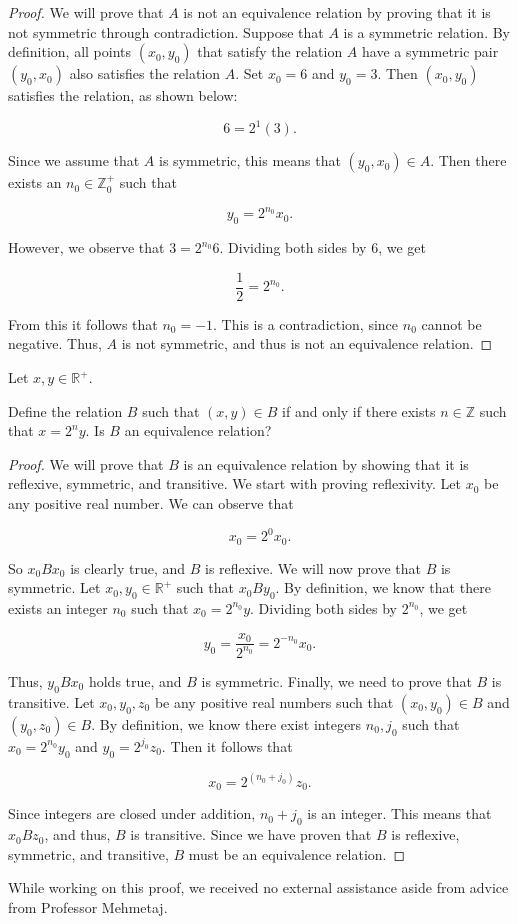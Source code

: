 \documentclass[12pt]{article}
\newenvironment{problem}[2][Problem]{\begin{trivlist}
\item[\hskip \labelsep {\bfseries #1}\hskip \labelsep {\bfseries #2.}]}{\end{trivlist}}
\begin{document}
\begin{proof}
We will prove that $A$ is not an equivalence relation by proving that it is not symmetric through contradiction. Suppose that $A$ is a symmetric relation. By definition, all points $(x_0,y_0)$ that satisfy the relation $A$ have a symmetric pair $(y_0,x_0)$ also satisfies the relation $A$. Set $x_0 = 6$ and $y_0 = 3$. Then $(x_0, y_0)$ satisfies the relation, as shown below:

$$6 = 2^1(3).$$

\noindent Since we assume that $A$ is symmetric, this means that $(y_0,x_0) \in A$. Then there exists an $n_0 \in \mathbb{Z}_0^+$ such that

$$y_0 = 2^{n_0}x_0.$$

\noindent
However, we observe that $3 = 2^{n_0}6$. Dividing both sides by 6, we get

$$\frac{1}{2} = 2^{n_0}.$$

\noindent From this it follows that $n_0 = -1$. This is a contradiction, since $n_0$ cannot be negative. Thus, $A$ is not symmetric, and thus is not an equivalence relation.


\end{proof}

\newpage
\begin{problem}{8c}
Let \( x, y \in \mathbb{R}^+ \).

Define the relation $B$ such that $(x, y) \in B$ if and only if there exists $n \in \mathbb{Z}$ such that $x = 2^ny$. Is $B$ an equivalence relation?

\end{problem}

\begin{proof}
We will prove that $B$ is an equivalence relation by showing that it is reflexive, symmetric, and transitive. We start with proving reflexivity. Let $x_0$ be any positive real number. We can observe that

$$x_0 = 2^0x_0.$$

So $x_0Bx_0$ is clearly true, and $B$ is reflexive. We will now prove that $B$ is symmetric. Let $x_0, y_0 \in \mathbb{R}^+$ such that $x_0By_0$. By definition, we know that there exists an integer $n_0$ such that $x_0 = 2^{n_0}y$. Dividing both sides by $2^{n_0}$, we get

$$y_0 = \frac{x_0}{2^{n_0}} = 2^{-n_0}x_0.$$

Thus, $y_0Bx_0$ holds true, and $B$ is symmetric. Finally, we need to prove that $B$ is transitive. Let $x_0, y_0, z_0$ be any positive real numbers such that $(x_0, y_0) \in B$ and $(y_0, z_0) \in B$. By definition, we know there exist integers $n_0, j_0$ such that $x_0 = 2^{n_0}y_0$ and $y_0 = 2^{j_0}z_0$. Then it follows that

$$x_0 = 2^{(n_0 + j_0)}z_0.$$

Since integers are closed under addition, $n_0 + j_0$ is an integer. This means that $x_0Bz_0$, and thus, $B$ is transitive. Since we have proven that $B$ is reflexive, symmetric, and transitive, $B$ must be an equivalence relation.

\end{proof}
  

\noindent While working on this proof, we received no external assistance aside from advice from Professor Mehmetaj.
\end{document}
